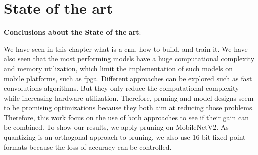 \chapter{State of the art} \label{chap:sota}

%

%
\begin{tcolorbox}
    \textbf{Conclusions about the State of the art}:

    We have seen in this chapter what is a \acrshort{cnn}, how to build, and train it. We have also seen that the most performing models have a huge computational complexity and memory utilization, which limit the implementation of such models on mobile platforms, such as \acrshort{fpga}. Different approaches can be explored such as fast convolutions algorithms. But they only reduce the computational complexity while increasing hardware utilization. Therefore, pruning and model designs seem to be promising optimizations because they both aim at reducing those problems. Therefore, this work focus on the use of both approaches to see if their gain can be combined. To show our results, we apply pruning on MobileNetV2. As quantizing is an orthogonal approach to pruning, we also use 16-bit fixed-point formats because the loss of accuracy can be controlled.
\end{tcolorbox}
\afterpage{\blankpage}
\cleardoublepage
\newpage
